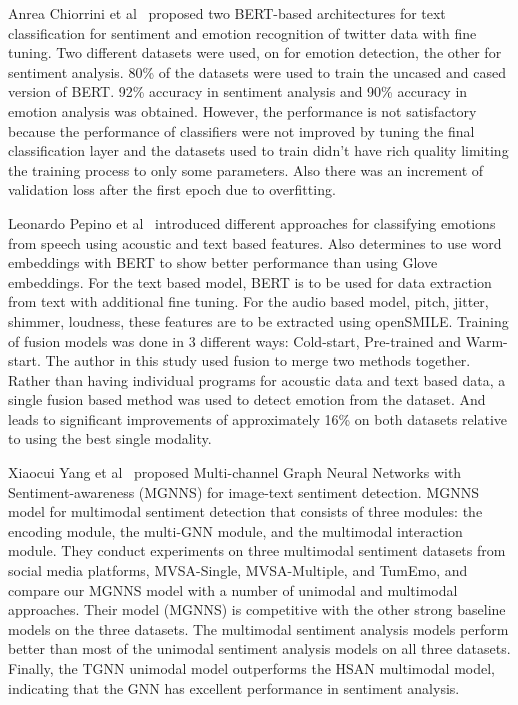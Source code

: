 Anrea Chiorrini et al~\cite{ref4} proposed two BERT-based architectures for text classification for sentiment and emotion recognition of twitter data with fine tuning. Two different datasets were used, on for emotion detection, the other for sentiment analysis. 80\% of the datasets were used to train the uncased and cased version of BERT. 92\% accuracy in sentiment analysis and 90\% accuracy in emotion analysis was obtained. However, the performance is not satisfactory because the performance of classifiers were not improved by tuning the final classification layer and the datasets used to train didn’t have rich quality limiting the training process to only some parameters. Also there was an increment of validation loss after the first epoch due to overfitting.

Leonardo Pepino et al~\cite{ref5} introduced different approaches for classifying emotions from speech using acoustic and text based features. Also determines to use word embeddings with BERT to show better performance than using Glove embeddings. For the text based model, BERT is to be used for data extraction from text with additional fine tuning. For the audio based model, pitch, jitter, shimmer, loudness, these features are to be extracted using openSMILE. Training of fusion models was done in 3 different ways: Cold-start, Pre-trained and Warm-start. The author in this study used fusion to merge two methods together. Rather than having individual programs for acoustic data and text based data, a single fusion based method was used to detect emotion from the dataset. And leads to significant improvements of approximately 16\% on both datasets relative to using the best single modality.


Xiaocui Yang et al~\cite{ref6} proposed Multi-channel Graph Neural Networks with Sentiment-awareness (MGNNS) for image-text sentiment detection. MGNNS model for multimodal sentiment detection that consists of three modules: the encoding module, the multi-GNN module, and the multimodal interaction module. They conduct experiments on three multimodal sentiment datasets from social media platforms, MVSA-Single, MVSA-Multiple, and TumEmo, and compare our MGNNS model with a number of unimodal and multimodal approaches. Their model (MGNNS) is competitive with the other strong baseline models on the three datasets. The multimodal sentiment analysis models perform better than most of the unimodal sentiment analysis models on all three datasets. Finally, the TGNN unimodal model outperforms the HSAN multimodal model, indicating that the GNN has excellent performance in sentiment analysis.


